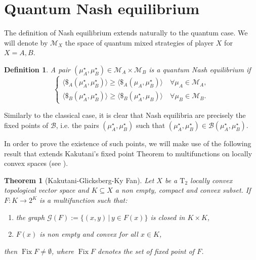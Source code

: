 \documentclass[11pt,a4paper,twoside]{article}
\newtheorem{definition}{Definition}
\newtheorem{theorem}{Theorem}
\begin{document}
\section{Quantum Nash equilibrium}
The definition of Nash equilibrium extends naturally to the quantum case. We will denote by $\mathcal{M}_X$ the space of quantum mixed strategies of player $X$ for $X=A,B$.
\begin{definition}
A pair $(\mu_A^\star, \mu_B^\star) \in \mathcal{M}_A \times \mathcal{M}_B$ is a \emph{quantum Nash equilibrium} if
\[
\begin{cases}
\langle\$_A(\mu_A^\star, \mu_B^\star)\rangle \geq \langle\$_A(\mu_A, \mu_B^\star)\rangle \quad \forall \mu_A \in \mathcal{M}_A, \\
\langle\$_B(\mu_A^\star, \mu_B^\star)\rangle \geq \langle\$_B(\mu_A^\star, \mu_B)\rangle \quad \forall \mu_B \in \mathcal{M}_B.
\end{cases}
\]
\end{definition}
Similarly to the classical case, it is clear that Nash equilibria are precisely the fixed points of $\mathcal{B}$, i.e. the pairs $(\mu_A^\star, \mu_B^\star)$ such that $(\mu_A^\star, \mu_B^\star) \in \mathcal{B}(\mu_A^\star, \mu_B^\star)$.

In order to prove the existence of such points, we will make use of the following result that extends Kakutani's fixed point Theorem to multifunctions on locally convex spaces (see \cite{arandelovic2000}).
\begin{theorem}[Kakutani-Glicksberg-Ky Fan]\label{teo_kgk}
Let $X$ be a $\text{T}_2$ locally convex topological vector space and $K \subseteq X$ a non empty, compact and convex subset. If $F: K \to 2^K$ is a multifunction such that:
\begin{enumerate}
    \item the graph $\mathcal{G}(F):=\{(x,y)\,|\, y\in F(x)\}$ is closed in $K\times K$,
    \item $F(x)$ is non empty and convex for all $x\in K$,
\end{enumerate}
then $\operatorname{Fix}F\neq \emptyset$, where $\operatorname{Fix}F$ denotes the set of fixed point of $F$.
\end{theorem}
\end{document}
